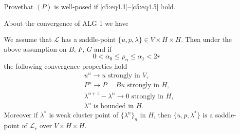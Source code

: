 \begin{exercise}\label{c5:exer4.1}%
Prove\pageoriginale  that $(P)$ is well-posed if \eqref{c5:eq4.1}--\eqref{c5:eq4.5} hold.
\end{exercise}  
 About the convergence of ALG 1 we have 
\begin{theorem}\label{c5:thm4.1}%
We assume that $\mathscr{L}$ has a saddle-point $\{u, p, \lambda \}  \in V \times H \times H$. Then under the above assumption on $B$, $F$, $G$ and if 
\begin{equation}
0 < \alpha_0 \leq \rho_n \leq \alpha_1 < 2r \tag{4.7}\label{c5:eq4.7}
 \end{equation} 
 the following convergence properties hold 
 \begin{align*}
& u^n  \to u \text{ strongly in } V,  \tag{4.8}\label{c5:eq4.8}\\
& P^n \to P = Bu \text{ strongly in } H, \tag{4.9}\label{c5:eq4.9}\\
& \lambda^{n+1} - \lambda^n \to 0 \text{ strongly in } H,
   \tag{4.10}\label{c5:eq4.10}\\ 
& \lambda^n \text{ is  bounded in }H. \tag{4.11}\label{c5:eq4.11}
 \end{align*}
 Moreover if $\lambda^*$ is weak cluster point of $\{\lambda^n \}_n$ in $H$, then $\{u, p, \lambda^* \}$ is a saddle-point of $\mathscr{L}_r$ over $V \times H \times H$.
\end{theorem}  
  
